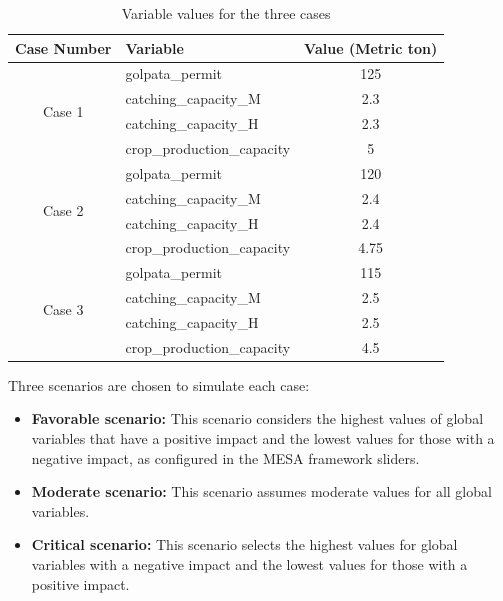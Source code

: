 \documentclass[final,5p,times,twocolumn,authoryear]{elsarticle}
\begin{document}
\begin{table}[h!]
\centering
\scriptsize  %
\setlength{\tabcolsep}{3pt}  %
\renewcommand{\arraystretch}{1.1}  %
\begin{tabular}{|c|l|c|}
\hline
\textbf{Case Number} & \textbf{Variable}                  & \textbf{Value (Metric ton)} \\ \hline
\multirow{4}{*}{Case 1} & golpata\_permit                   & 125                        \\ \cline{2-3} 
                       & catching\_capacity\_M             & 2.3                        \\ \cline{2-3} 
                       & catching\_capacity\_H             & 2.3                        \\ \cline{2-3} 
                       & crop\_production\_capacity        & 5                          \\ \hline
\multirow{4}{*}{Case 2} & golpata\_permit                   & 120                        \\ \cline{2-3} 
                       & catching\_capacity\_M             & 2.4                        \\ \cline{2-3} 
                       & catching\_capacity\_H             & 2.4                        \\ \cline{2-3} 
                       & crop\_production\_capacity        & 4.75                       \\ \hline
\multirow{4}{*}{Case 3} & golpata\_permit                   & 115                        \\ \cline{2-3} 
                       & catching\_capacity\_M             & 2.5                        \\ \cline{2-3} 
                       & catching\_capacity\_H             & 2.5                        \\ \cline{2-3} 
                       & crop\_production\_capacity        & 4.5                        \\ \hline
\end{tabular}
\caption{Variable values for the three cases}
\label{tab:case-scenarios}
\end{table}
Three scenarios are chosen to simulate each case:
\begin{itemize}
    \item \textbf{Favorable scenario:} This scenario considers the highest values of global variables that have a positive impact and the lowest values for those with a negative impact, as configured in the MESA framework sliders.
    \item \textbf{Moderate scenario:} This scenario assumes moderate values for all global variables.
    \item \textbf{Critical scenario:} This scenario selects the highest values for global variables with a negative impact and the lowest values for those with a positive impact.
\end{itemize}
\end{document}
